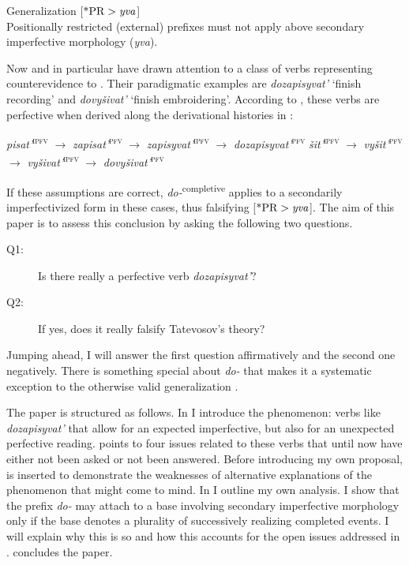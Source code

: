\documentclass[output=paper,
colorlinks,
citecolor=brown,
newtxmath
]{langscibook}
\begin{document}
\ea\label{tategen}
Generalization [$\text{*PR}>\text{\textit{yva}}$]\\
Positionally restricted (external) prefixes must not apply above secondary imperfective morphology (\textit{yva}).
\z

\noindent Now \citet{Zinova.Filip2015} and in particular \citet{Zinova2016} have drawn attention to a class of verbs representing counterevidence to . Their paradigmatic examples are \textit{dozapisyvat'} `finish recording' and \textit{dovyšivat'} `finish embroidering'. According to \citet{Zinova.Filip2015}, these verbs are perfective when derived along the derivational histories in :

\ea\label{dh1}
\ea \textit{pisat'}\textsuperscript{\textsc{ipfv}} $\rightarrow$ \textit{zapisat'}\textsuperscript{\textsc{pfv}} $\rightarrow$ \textit{zapisyvat'}\textsuperscript{\textsc{ipfv}} $\rightarrow$ \textit{dozapisyvat'}\textsuperscript{\textsc{pfv}}
\ex \textit{šit'}\textsuperscript{\textsc{ipfv}} $\rightarrow$ \textit{vyšit'}\textsuperscript{\textsc{pfv}} $\rightarrow$ \textit{vyšivat'}\textsuperscript{\textsc{ipfv}} $\rightarrow$ \textit{dovyšivat'}\textsuperscript{\textsc{pfv}}
\z\z

\noindent If these assumptions are correct, \textit{do-}\textsuperscript{completive} applies to a secondarily imperfectivized form in these cases, thus falsifying [$\text{*PR}>\text{\textit{yva}}$].
The aim of this paper is to assess this conclusion by asking the following two questions.

\begin{exe}
\ex\label{2questions}
\begin{description}
\item[Q1:] Is there really a perfective verb \textit{dozapisyvat'}?
\item[Q2:] If yes, does it really falsify Tatevosov's theory?
\end{description}
\end{exe}

\noindent Jumping ahead, I will answer the first question affirmatively and the second one negatively. There is something special about \textit{do-} that makes it a systematic exception to the otherwise valid generalization .

The paper is structured as follows. In  I introduce the phenomenon: verbs like \textit{dozapisyvat'} that allow for an expected imperfective, but also for an unexpected perfective reading.  points to four issues related to these verbs that until now have either not been asked or not been answered. Before introducing my own proposal,  is inserted to demonstrate the weaknesses of alternative explanations of the phenomenon that might come to mind. In  I outline my own analysis. I show that the prefix \textit{do-} may attach to a base involving secondary imperfective morphology only if the base denotes a plurality of successively realizing completed events.
I will explain why this is so and how this accounts for the open issues addressed in .
 concludes the paper.
\end{document}
